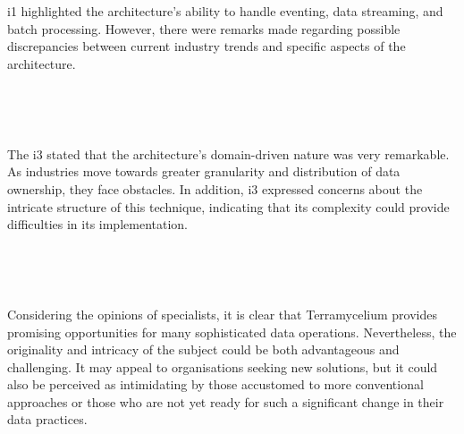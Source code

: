 \documentclass[review]{elsarticle}
\begin{document}
\,

\setlength{\fboxsep}{0.3em}

\noindent{}

\,

i1 highlighted the architecture's ability to handle eventing, data streaming, and batch processing. However, there were remarks made regarding possible discrepancies between current industry trends and specific aspects of the architecture.

\,

\setlength{\fboxsep}{0.3em}

\noindent{}

\,

The i3 stated that the architecture's domain-driven nature was very remarkable. As industries move towards greater granularity and distribution of data ownership, they face obstacles. In addition, i3 expressed concerns about the intricate structure of this technique, indicating that its complexity could provide difficulties in its implementation.

\,

\setlength{\fboxsep}{0.3em}

\noindent{}

\,

Considering the opinions of specialists, it is clear that Terramycelium provides promising opportunities for many sophisticated data operations. Nevertheless, the originality and intricacy of the subject could be both advantageous and challenging. It may appeal to organisations seeking new solutions, but it could also be perceived as intimidating by those accustomed to more conventional approaches or those who are not yet ready for such a significant change in their data practices.
\end{document}
